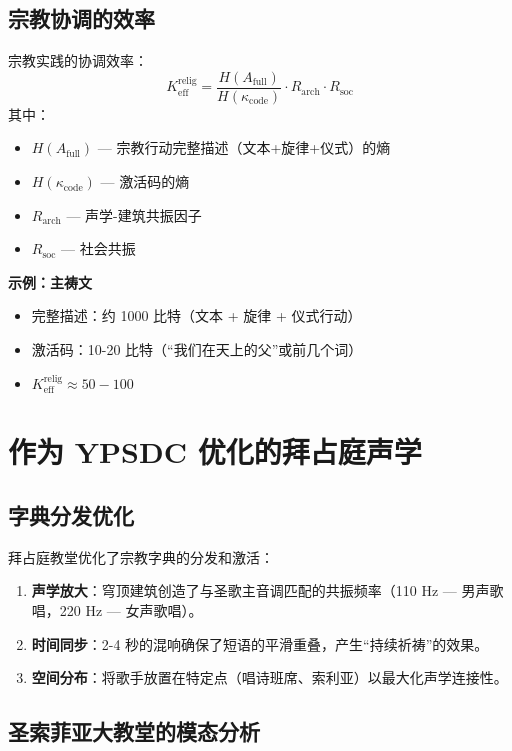 \documentclass[12pt,a4paper]{article}
\begin{document}
	\subsection{宗教协调的效率}
	
	宗教实践的协调效率：
	\[
	K_{\mathrm{eff}}^{\mathrm{relig}} = \frac{H(A_{\mathrm{full}})}{H(\kappa_{\mathrm{code}})} \cdot R_{\mathrm{arch}} \cdot R_{\mathrm{soc}}
	\]
	其中：
	\begin{itemize}
		\item $H(A_{\mathrm{full}})$ — 宗教行动完整描述（文本+旋律+仪式）的熵
		\item $H(\kappa_{\mathrm{code}})$ — 激活码的熵
		\item $R_{\mathrm{arch}}$ — 声学-建筑共振因子
		\item $R_{\mathrm{soc}}$ — 社会共振
	\end{itemize}
	
	\textbf{示例：主祷文}
	\begin{itemize}
		\item 完整描述：约 1000 比特（文本 + 旋律 + 仪式行动）
		\item 激活码：10-20 比特（“我们在天上的父”或前几个词）
		\item $K_{\mathrm{eff}}^{\mathrm{relig}} \approx 50-100$
	\end{itemize}
	
	\section{作为 YPSDC 优化的拜占庭声学}
	
	\subsection{字典分发优化}
	
	拜占庭教堂优化了宗教字典的分发和激活：
	
	\begin{enumerate}
		\item \textbf{声学放大}：穹顶建筑创造了与圣歌主音调匹配的共振频率（110 Hz — 男声歌唱，220 Hz — 女声歌唱）。
		\item \textbf{时间同步}：2-4 秒的混响确保了短语的平滑重叠，产生“持续祈祷”的效果。
		\item \textbf{空间分布}：将歌手放置在特定点（唱诗班席、索利亚）以最大化声学连接性。
	\end{enumerate}
	
	\subsection{圣索菲亚大教堂的模态分析}
	
\end{document}
